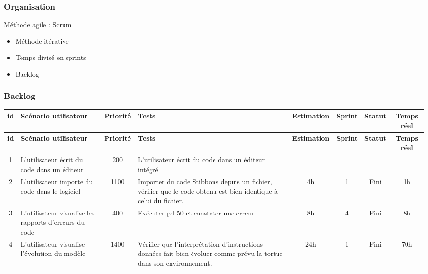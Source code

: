 \begin{frame}
\frametitle{Organisation}
Méthode agile : Scrum
\begin{itemize}
\item Méthode itérative
\item Temps divisé en sprints
\item Backlog
\end{itemize}
\end{frame}


\begin{frame}
\frametitle{Backlog}
{\tiny
\begin{longtable}[c]{|c|p{1cm}|c|p{1.7cm}|*{4}{c|}}
\hline
\bf id & \bf Scénario utilisateur & \bf Priorité & \bf Tests & \bf Estimation & \bf Sprint & \bf Statut & \bf Temps réel \\
\hline
\endfirsthead
\hline
\bf id & \bf Scénario utilisateur & \bf Priorité & \bf Tests & \bf Estimation & \bf Sprint & \bf Statut & \bf Temps réel \\
\hline
\endhead
1 & L'utilisateur écrit du code dans un éditeur & 200 & L'utilisateur écrit du code dans un éditeur intégré & & & & \\
\hline
2 & L'utilisateur importe du code dans le logiciel & 1100 & Importer du code Stibbons depuis un fichier, vérifier que le code obtenu est bien identique à celui du fichier. & 4h & 1 & Fini & 1h \\
\hline
3 & L'utilisateur visualise les rapports d'erreurs du code & 400 & Exécuter pd 50 et constater une erreur. & 8h & 4 & Fini & 8h \\
\hline
4 & L'utilisateur visualise l'évolution du modèle & 1400 & Vérifier que l'interprétation d'instructions données fait bien évoluer comme prévu la tortue dans son environnement. & 24h & 1 & Fini & 70h \\
\hline
\end{longtable}}
\end{frame}

